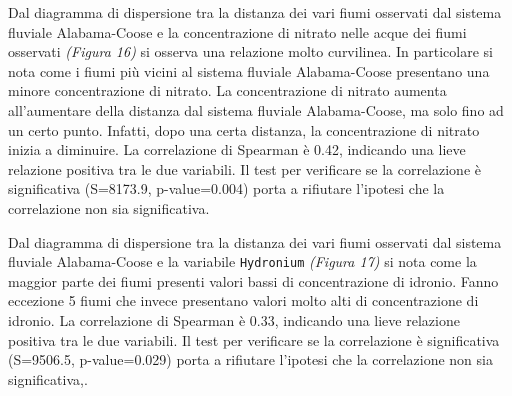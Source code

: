 \documentclass{article} %
\begin{document}
Dal diagramma di dispersione tra la distanza dei vari fiumi osservati dal sistema fluviale Alabama-Coose e la concentrazione di nitrato nelle acque dei fiumi osservati \textit{(Figura 16)} si osserva una relazione molto curvilinea.
In particolare si nota come i fiumi più vicini al sistema fluviale Alabama-Coose presentano una minore concentrazione di nitrato. La concentrazione di nitrato aumenta all'aumentare della distanza dal sistema fluviale Alabama-Coose, ma solo fino ad un certo punto. Infatti, dopo una certa distanza, la concentrazione di nitrato inizia a diminuire.
La correlazione di Spearman è 0.42, indicando una lieve relazione positiva tra le due variabili. 
Il test per verificare se la correlazione è significativa (S=8173.9, p-value=0.004) porta a rifiutare l'ipotesi che la correlazione non sia significativa.

Dal diagramma di dispersione tra la distanza dei vari fiumi osservati dal sistema fluviale Alabama-Coose e la variabile \texttt{Hydronium} \textit{(Figura 17)} si nota come la maggior parte dei fiumi presenti valori bassi di concentrazione di idronio. Fanno eccezione 5 fiumi che invece presentano valori molto alti di concentrazione di idronio. 
La correlazione di Spearman è 0.33, indicando una lieve relazione positiva tra le due variabili. 
Il test per verificare se la correlazione è significativa (S=9506.5, p-value=0.029) porta a rifiutare l'ipotesi che la correlazione non sia significativa,.
\end{document}
